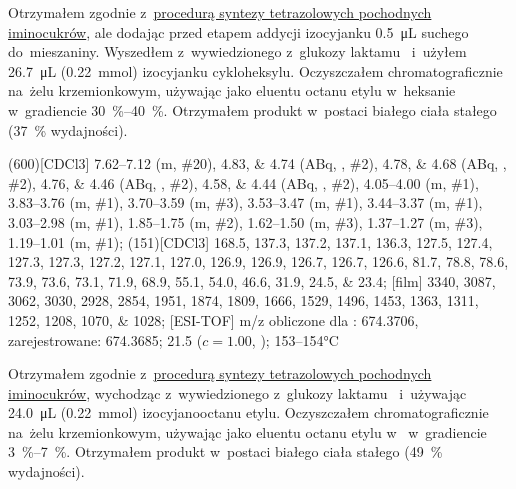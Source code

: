 Otrzymałem zgodnie z~\hyperref[experimental:sugars:schwartz]{procedurą syntezy tetrazolowych
  pochodnych iminocukrów}, ale dodając przed etapem addycji izocyjanku
  \SI{0.5}{\micro\liter} suchego  do~mieszaniny.
Wyszedłem z~wywiedzionego z~glukozy laktamu~
  i~użyłem \SI{26.7}{\micro\liter} (\SI{0.22}{\milli\mol}) izocyjanku cykloheksylu.
Oczyszczałem chromatograficznie na~żelu krzemionkowym,
  używając jako eluentu octanu etylu w~heksanie w~gradiencie \SIrange{30}{40}{\percent}.
Otrzymałem produkt w~postaci białego ciała stałego (\SI{37}{\percent} wydajności).

\begin{fullexp}
  \NMR(600)[CDCl3] \numrange{7.62}{7.12} (m, \#{20}), \numlist{4.83;4.74} (ABq, , \#{2}), \numlist{4.78;4.68} (ABq, , \#{2}), \numlist{4.76;4.46} (ABq, , \#{2}), \numlist{4.58;4.44} (ABq, , \#{2}), \numrange{4.05}{4.00} (m, \#{1}), \numrange{3.83}{3.76} (m, \#{1}), \numrange{3.70}{3.59} (m, \#{3}), \numrange{3.53}{3.47} (m, \#{1}), \numrange{3.44}{3.37} (m, \#{1}), \numrange{3.03}{2.98} (m, \#{1}), \numrange{1.85}{1.75} (m, \#{2}), \numrange{1.62}{1.50} (m, \#{3}), \numrange{1.37}{1.27} (m, \#{3}), \numrange{1.19}{1.01} (m, \#{1});
  (151)[CDCl3] \numlist{168.5; 137.3; 137.2; 137.1; 136.3; 127.5; 127.4; 127.3; 127.3; 127.2; 127.1; 127.0; 126.9; 126.9; 126.7; 126.7; 126.6; 81.7; 78.8; 78.6; 73.9; 73.6; 73.1; 71.9; 68.9; 55.1; 54.0; 46.6; 31.9; 24.5; 23.4};
  [film] \numlist{3340; 3087; 3062; 3030; 2928; 2854; 1951; 1874; 1809; 1666; 1529; 1496; 1453; 1363; 1311; 1252; 1208; 1070; 1028};
  [ESI-TOF] m/z obliczone dla : \num{674.3706}, zarejestrowane: \num{674.3685};
  \data{[$\alpha^{23}_D$]~$=$} \num{21.5} ($c = 1.00$, );
   \numrange{153}{154}\si{\celsius}
\end{fullexp}

Otrzymałem zgodnie z~\hyperref[experimental:sugars:schwartz]{procedurą syntezy tetrazolowych
  pochodnych iminocukrów}, wychodząc z~wywiedzionego z~glukozy laktamu~
  i~używając \SI{24.0}{\micro\liter} (\SI{0.22}{\milli\mol}) izocyjanooctanu etylu.
Oczyszczałem chromatograficznie na~żelu krzemionkowym,
  używając jako eluentu octanu etylu w~ w~gradiencie \SIrange{3}{7}{\percent}.
Otrzymałem produkt w~postaci białego ciała stałego (\SI{49}{\percent} wydajności).

